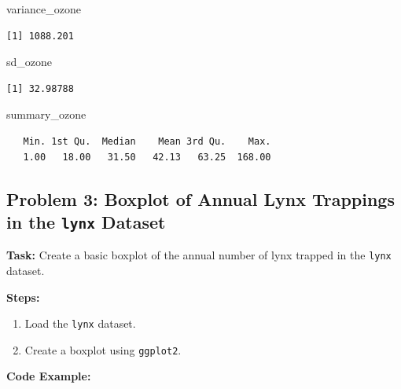 \documentclass[
  letterpaper,
  DIV=11,
  numbers=noendperiod]{scrreprt}
\newenvironment{Shaded}{\begin{snugshade}}{\end{snugshade}}
\newcommand{\NormalTok}[1]{\textcolor[rgb]{0.00,0.23,0.31}{#1}}
\providecommand{\tightlist}{%
  \setlength{\itemsep}{0pt}\setlength{\parskip}{0pt}}\usepackage{longtable,booktabs,array}
\begin{document}
\begin{Shaded}
\begin{Highlighting}[]
\NormalTok{variance\_ozone}
\end{Highlighting}
\end{Shaded}

\begin{verbatim}
[1] 1088.201
\end{verbatim}

\begin{Shaded}
\begin{Highlighting}[]
\NormalTok{sd\_ozone}
\end{Highlighting}
\end{Shaded}

\begin{verbatim}
[1] 32.98788
\end{verbatim}

\begin{Shaded}
\begin{Highlighting}[]
\NormalTok{summary\_ozone}
\end{Highlighting}
\end{Shaded}

\begin{verbatim}
   Min. 1st Qu.  Median    Mean 3rd Qu.    Max. 
   1.00   18.00   31.50   42.13   63.25  168.00 
\end{verbatim}

\subsection*{\texorpdfstring{Problem 3: Boxplot of Annual Lynx Trappings
in the \texttt{lynx}
Dataset}{Problem 3: Boxplot of Annual Lynx Trappings in the lynx Dataset}}\label{problem-3-boxplot-of-annual-lynx-trappings-in-the-lynx-dataset}

\textbf{Task:} Create a basic boxplot of the annual number of lynx
trapped in the \texttt{lynx} dataset.

\textbf{Steps:}

\begin{enumerate}
\def\labelenumi{\arabic{enumi}.}
\tightlist
\item
  Load the \texttt{lynx} dataset.
\item
  Create a boxplot using \texttt{ggplot2}.
\end{enumerate}

\textbf{Code Example:}
\end{document}
